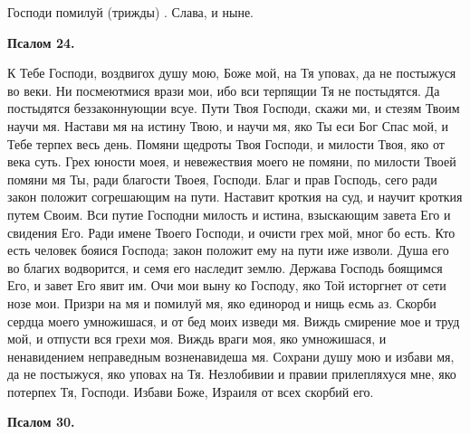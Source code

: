 Господи помилуй (трижды) . Слава, и ныне.


\medskip


\bfseries Псалом 24.\normalfont{}\nopagebreak


К Тебе Господи, воздвигох душу мою, Боже мой, на Тя уповах, да не постыжуся во веки. Ни посмеютмися врази мои, ибо вси терпящии Тя не постыдятся. Да постыдятся беззаконнующии всуе. Пути Твоя Господи, скажи ми, и стезям Твоим научи мя. Настави мя на истину Твою, и научи мя, яко Ты еси Бог Спас мой, и Тебе терпех весь день. Помяни щедроты Твоя Господи, и милости Твоя, яко от века суть. Грех юности моея, и невежествия моего не помяни, по милости Твоей помяни мя Ты, ради благости Твоея, Господи. Благ и прав Господь, сего ради закон положит согрешающим на пути. Наставит кроткия на суд, и научит кроткия путем Своим. Вси путие Господни милость и истина, взыскающим завета Его и свидения Его. Ради имене Твоего Господи, и очисти грех мой, мног бо есть. Кто есть человек бояися Господа; закон положит ему на пути иже изволи. Душа его во благих водворится, и семя его наследит землю. Держава Господь боящимся Его, и завет Его явит им. Очи мои выну ко Господу, яко Той исторгнет от сети нозе мои. Призри на мя и помилуй мя, яко единород и нищь есмь аз. Скорби сердца моего умножишася, и от бед моих изведи мя. Виждь смирение мое и труд мой, и отпусти вся грехи моя. Виждь враги моя, яко умножишася, и ненавидением неправедным возненавидеша мя. Сохрани душу мою и избави мя, да не постыжуся, яко уповах на Тя. Незлобивии и правии прилепляхуся мне, яко потерпех Тя, Господи. Избави Боже, Израиля от всех скорбий его.


\medskip


\bfseries Псалом 30.\normalfont{}\nopagebreak


